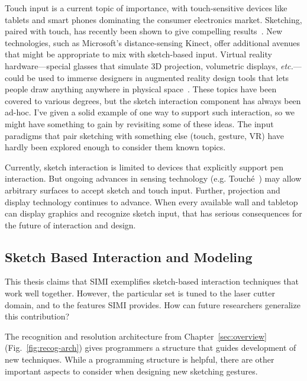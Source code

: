 Touch input is a current topic of importance, with touch-sensitive
devices like tablets and smart phones dominating the consumer
electronics market. Sketching, paired with touch, has recently been
shown to give compelling results~\cite{hinckley-pen-touch}. New
technologies, such as Microsoft's distance-sensing Kinect, offer
additional avenues that might be appropriate to mix with sketch-based
input. Virtual reality hardware---special glasses that simulate 3D
projection, volumetric displays, \textit{etc.}---could be used to
immerse designers in augmented reality design tools that lets people
draw anything anywhere in physical space~\cite{jung-lightpen}. These
topics have been covered to various degrees, but the sketch
interaction component has always been ad-hoc. I've given a solid
example of one way to support such interaction, so we might have
something to gain by revisiting some of these ideas. The input
paradigms that pair sketching with something else (touch, gesture, VR)
have hardly been explored enough to consider them known topics.

Currently, sketch interaction is limited to devices that explicitly
support pen interaction. But ongoing advances in sensing technology
(e.g. Touch\'e~\cite{sato-touche}) may allow arbitrary surfaces to
accept sketch and touch input. Further, projection and display
technology continues to advance. When every available wall and
tabletop can display graphics and recognize sketch input, that has
serious consequences for the future of interaction and design.

\subsection{Sketch Based Interaction and Modeling}

This thesis claims that SIMI exemplifies sketch-based interaction
techniques that work well together. However, the particular set is
tuned to the laser cutter domain, and to the features SIMI
provides. How can future researchers generalize this contribution?

The recognition and resolution architecture from
Chapter~\ref{sec:overview} (Fig.~\ref{fig:recog-arch}) gives
programmers a structure that guides development of new
techniques. While a programming structure is helpful, there are other
important aspects to consider when designing new sketching gestures.



